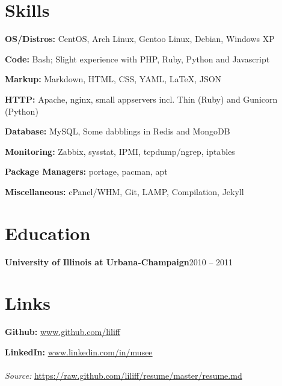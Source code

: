 \documentclass{article}
\newenvironment{entity}[2]{%
    \textbf{#1}\hfill #2\par
}{
    \vspace{0.1em}%
    \par%
}
\begin{document}
\section{Skills}

\textbf{OS/Distros:} CentOS, Arch Linux, Gentoo Linux, Debian, Windows XP\par
\textbf{Code:} Bash; Slight experience with PHP, Ruby, Python and Javascript\par
\textbf{Markup:} Markdown, HTML, CSS, YAML, \LaTeX, JSON\par
\textbf{HTTP:} Apache, nginx, small appservers incl. Thin (Ruby) and Gunicorn (Python)\par
\textbf{Database:} MySQL, Some dabblings in Redis and MongoDB\par
\textbf{Monitoring:} Zabbix, sysstat, IPMI, tcpdump/ngrep, iptables\par
\textbf{Package Managers:} portage, pacman, apt\par
\textbf{Miscellaneous:} cPanel/WHM, Git, LAMP, Compilation, Jekyll
\section{Education}

    \begin{entity}{University of Illinois at Urbana-Champaign}{2010 -- 2011}


    \end{entity}
\section{Links}

\textbf{Github:} \url{www.github.com/liliff}\par
\textbf{LinkedIn:} \url{www.linkedin.com/in/musee}
\\
\\
\textsl{Source:} \url{https://raw.github.com/liliff/resume/master/resume.md}
\end{document}
